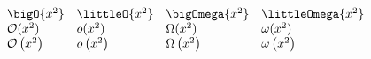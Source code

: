 \documentclass{unittest}
\begin{document}
\(\begin{array}{lllll}
	\bigO{x^2}       & \littleO{x^2}  & \bigOmega{x^2} & \littleOmega{x^2} &
\\  \mathcal{O}(x^2) & o(x^2) & \Omega(x^2) & \omega(x^2) &
\\  \mathcal{O}\left(x^2\right) & o\left(x^2\right) & \Omega\left(x^2\right) & \omega\left(x^2\right) &
\end{array}\)
\end{document}
